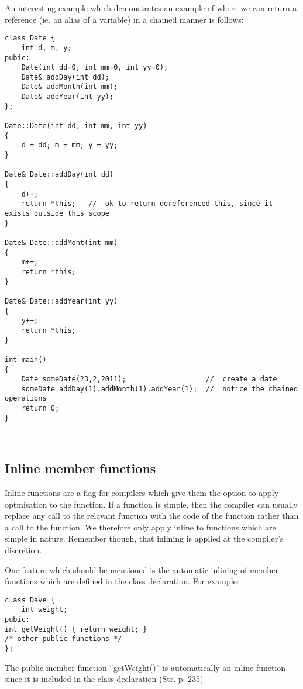An interesting example which demonstrates an example of where we can return a reference (ie. an alias of a variable) in a chained manner is follows:
\begin{lstlisting}[label=chained,caption=Chained operations]
class Date {
	int d, m, y;
pubic:
	Date(int dd=0, int mm=0, int yy=0);
	Date& addDay(int dd);
	Date& addMonth(int mm);
	Date& addYear(int yy);
};

Date::Date(int dd, int mm, int yy)
{
	d = dd; m = mm; y = yy;
}

Date& Date::addDay(int dd)
{
	d++;
	return *this;	//	ok to return dereferenced this, since it exists outside this scope
}

Date& Date::addMont(int mm)
{
	m++;
	return *this;
}

Date& Date::addYear(int yy)
{
	y++;
	return *this;
}

int main()
{
	Date someDate(23,2,2011);					//	create a date
	someDate.addDay(1).addMonth(1).addYear(1);	//	notice the chained operations
	return 0;
}
	
	
\end{lstlisting}


\subsection{Inline member functions}

Inline functions are a flag for compilers which give them the option to apply optmisation to the function. If a function is simple, then the compiler can usually replace any call to the relavant function with the code of the function rather than a call to the function. We therefore only apply inline to functions which are simple in nature. Remember though, that inlining is applied at the compiler's discretion. 

One feature which should be mentioned is the automatic inlining of member functions which are defined in the class declaration. For example:
\begin{lstlisting}
class Dave {
	int weight;
pubic:
int getWeight() { return weight; }
/* other public functions */
};
\end{lstlisting}
The public member function ``getWeight()'' is automatically an inline function since it is included in the class declaration (Str. p. 235)

